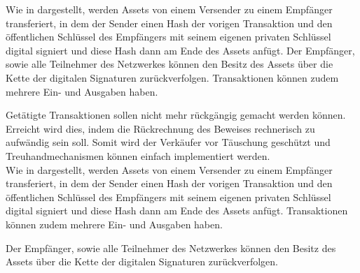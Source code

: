    Wie in  dargestellt, werden Assets von einem Versender zu einem Empfänger transferiert, in dem der Sender einen Hash der vorigen Transaktion und den öffentlichen Schlüssel des Empfängers mit seinem eigenen privaten Schlüssel digital signiert und diese Hash dann am Ende des Assets anfügt.
    Der Empfänger, sowie alle Teilnehmer des Netzwerkes können den Besitz des Assets über die Kette der digitalen Signaturen zurückverfolgen.
    Transaktionen können zudem mehrere Ein- und Ausgaben haben.\cite{Nakamoto2008}
    
    Getätigte Transaktionen sollen nicht mehr rückgängig gemacht werden können.
    Erreicht wird dies, indem die Rückrechnung des Beweises rechnerisch zu aufwändig sein soll\cite{Nakamoto2008}.
    Somit wird der Verkäufer vor Täuschung geschützt und Treuhandmechanismen können einfach implementiert werden\cite{Nakamoto2008}.  
    \medskip\\
    Wie in  dargestellt, werden Assets von einem Versender zu einem Empfänger transferiert, in dem der Sender einen Hash der vorigen Transaktion und den öffentlichen Schlüssel des Empfängers mit seinem eigenen privaten Schlüssel digital signiert und diese Hash dann am Ende des Assets anfügt.
    Transaktionen können zudem mehrere Ein- und Ausgaben haben\cite{Nakamoto2008}.
    
    Der Empfänger, sowie alle Teilnehmer des Netzwerkes können den Besitz des Assets über die Kette der digitalen Signaturen zurückverfolgen\cite{Nakamoto2008}.
	
